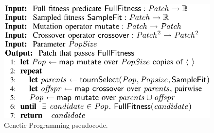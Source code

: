\begin{figure}[htbp]
\includegraphics[width=\linewidth]{figs/gp.png}
\caption{Genetic Programming pseudocode.}
\label{fig:gp_pseudo}
\end{figure}
